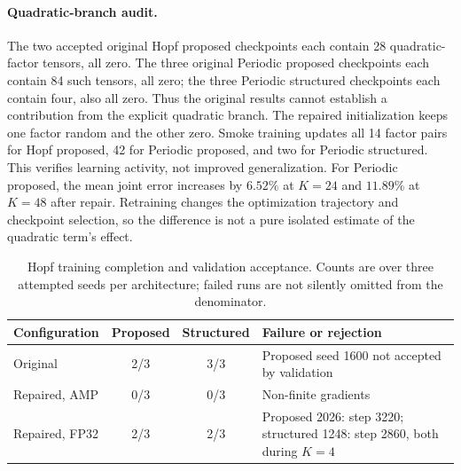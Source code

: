 \paragraph{Quadratic-branch audit.}
The two accepted original Hopf proposed checkpoints each contain 28
quadratic-factor tensors, all zero. The three original Periodic
proposed checkpoints each contain 84 such tensors, all zero; the three
Periodic structured checkpoints each contain four, also all zero.
Thus the original results cannot establish a contribution from the
explicit quadratic branch. The repaired initialization keeps one factor
random and the other zero. Smoke training updates all 14 factor pairs
for Hopf proposed, 42 for Periodic proposed, and two for Periodic
structured. This verifies learning activity, not improved generalization.
For Periodic proposed, the mean joint error increases by $6.52\%$ at
$K=24$ and $11.89\%$ at $K=48$ after repair. Retraining changes the
optimization trajectory and checkpoint selection, so the difference is
not a pure isolated estimate of the quadratic term's effect.

\begin{table}[H]
\centering
\caption{Hopf training completion and validation acceptance.
Counts are over three attempted seeds per architecture; failed runs
are not silently omitted from the denominator.}
\label{tab:hopf_completion}
\small
\begin{tabular}{@{}lccp{5.8cm}@{}}
\toprule
Configuration & Proposed & Structured & Failure or rejection\\
\midrule
Original & 2/3 & 3/3 & Proposed seed 1600 not accepted by validation\\
Repaired, AMP & 0/3 & 0/3 & Non-finite gradients\\
Repaired, FP32 & 2/3 & 2/3 & Proposed 2026: step 3220; structured 1248:
step 2860, both during $K=4$\\
\bottomrule
\end{tabular}
\end{table}

